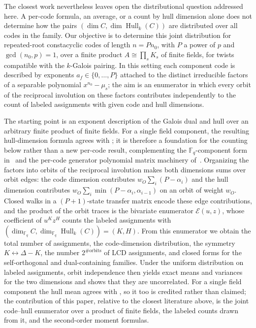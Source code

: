 \documentclass[11pt]{article}
\theoremstyle{definition}
\theoremstyle{remark}
\newcommand{\Fq}{\mathbb{F}_q}
\newcommand{\Hull}{\operatorname{Hull}}
\begin{document}
The closest work nevertheless leaves open the distributional question
addressed here. A per-code formula, an average, or a count by hull
dimension alone does not determine how the pairs
\((\dim C, \dim \Hull_k(C))\) are distributed over all codes in the
family. Our objective is to determine this joint distribution for
repeated-root constacyclic codes of length \(n = P n_0\), with \(P\)
a power of \(p\) and \(\gcd(n_0,p)=1\), over a finite product
\(A \cong \prod_s K_s\) of finite fields, for twists compatible with
the \(k\)-Galois pairing. In this setting each component code is
described by exponents \(a_f \in \{0,\dots,P\}\) attached to the
distinct irreducible factors of a separable polynomial
\(x^{n_0} - \mu_s\); the aim is an enumerator in which every orbit of
the reciprocal involution on these factors contributes independently
to the count of labeled assignments with given code and hull
dimensions.

The starting point is an exponent description of the Galois dual and
hull over an arbitrary finite product of finite fields. For a single
field component, the resulting hull-dimension formula agrees with
\cite[Theorem~3]{DPI2023}; it is therefore a foundation for the
counting below rather than a new per-code result, complementing the
\(\Fq\)-component form in~\cite{DIMP2026} and the per-code generator
polynomial matrix machinery of~\cite{ES2026}. Organizing the factors
into orbits of the reciprocal involution makes both dimensions sums
over orbit edges: the code dimension contributes
\(w_O \sum_i (P-\alpha_i)\) and the hull dimension contributes
\(w_O \sum_i \min(P-\alpha_i, \alpha_{i-1})\) on an orbit of weight
\(w_O\). Closed walks in a \((P{+}1)\)-state transfer matrix encode
these edge contributions, and the product of the orbit traces is the
bivariate enumerator \(\mathcal{E}(u,z)\), whose coefficient of
\(u^K z^H\) counts the labeled assignments with
\((\dim_{\Fq} C, \dim_{\Fq} \Hull_k(C)) = (K,H)\). From this
enumerator we obtain the total number of assignments, the
code-dimension distribution, the symmetry
\(K \leftrightarrow \Delta - K\), the number
\(2^{\#\mathrm{orbits}}\) of LCD assignments, and closed forms for
the self-orthogonal and dual-containing families. Under the uniform
distribution on labeled assignments, orbit independence then yields
exact means and variances for the two dimensions and shows that they
are uncorrelated. For a single field component the hull mean agrees
with \cite[Theorem~3.3]{DP2025}, so it too is credited rather than
claimed; the contribution of this paper, relative to the closest
literature above, is the joint code--hull enumerator over a product
of finite fields, the labeled counts drawn from it, and the
second-order moment formulas.
\end{document}
